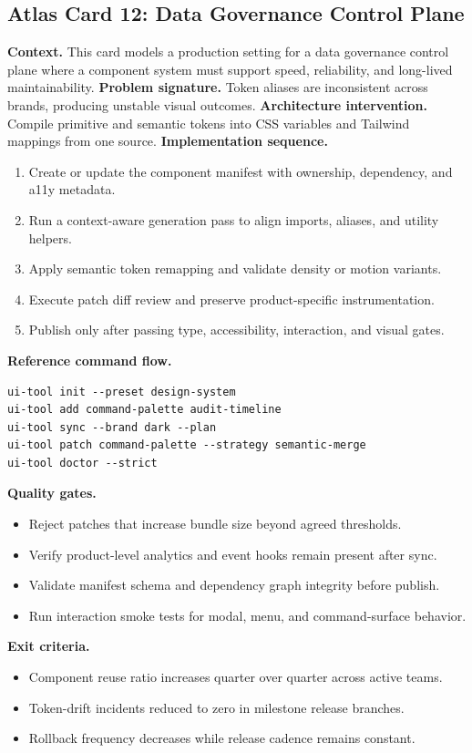 \subsection*{Atlas Card 12: Data Governance Control Plane}
\textbf{Context.} This card models a production setting for a data governance control plane where a component system must support speed, reliability, and long-lived maintainability.
\textbf{Problem signature.} Token aliases are inconsistent across brands, producing unstable visual outcomes.
\textbf{Architecture intervention.} Compile primitive and semantic tokens into CSS variables and Tailwind mappings from one source.
\textbf{Implementation sequence.}
\begin{enumerate}[leftmargin=*, itemsep=0.28em]
  \item Create or update the component manifest with ownership, dependency, and a11y metadata.
  \item Run a context-aware generation pass to align imports, aliases, and utility helpers.
  \item Apply semantic token remapping and validate density or motion variants.
  \item Execute patch diff review and preserve product-specific instrumentation.
  \item Publish only after passing type, accessibility, interaction, and visual gates.
\end{enumerate}
\textbf{Reference command flow.}
\begin{verbatim}
ui-tool init --preset design-system
ui-tool add command-palette audit-timeline
ui-tool sync --brand dark --plan
ui-tool patch command-palette --strategy semantic-merge
ui-tool doctor --strict
\end{verbatim}
\textbf{Quality gates.}
\begin{itemize}[leftmargin=*, itemsep=0.24em]
  \item Reject patches that increase bundle size beyond agreed thresholds.
  \item Verify product-level analytics and event hooks remain present after sync.
  \item Validate manifest schema and dependency graph integrity before publish.
  \item Run interaction smoke tests for modal, menu, and command-surface behavior.
\end{itemize}
\textbf{Exit criteria.}
\begin{itemize}[leftmargin=*, itemsep=0.24em]
  \item Component reuse ratio increases quarter over quarter across active teams.
  \item Token-drift incidents reduced to zero in milestone release branches.
  \item Rollback frequency decreases while release cadence remains constant.
\end{itemize}
\clearpage
